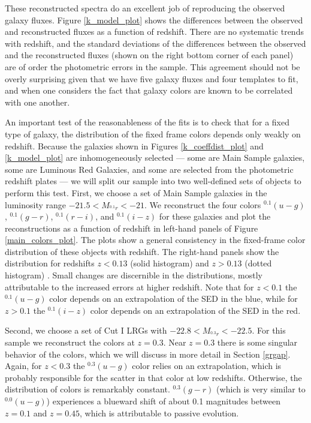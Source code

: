 \documentclass[10pt,preprint]{aastex}
\newcommand{\band}[2]{\ensuremath{^{#1}\!{#2}}}
\begin{document}
These reconstructed spectra do an excellent job of reproducing the
observed galaxy fluxes. Figure \ref{k_model_plot} shows the
differences between the observed and reconstructed fluxes as a
function of redshift. There are no systematic trends with redshift,
and the standard deviations of the differences between the observed
and the reconstructed fluxes (shown on the right bottom corner of each
panel) are of order the photometric errors in the sample. This
agreement should not be overly surprising given that we have five
galaxy fluxes and four templates to fit, and when one considers the
fact that galaxy colors are known to be correlated with one another.

An important test of the reasonableness of the fits is to check that
for a fixed type of galaxy, the distribution of the fixed frame colors
depends only weakly on redshift. Because the galaxies shown in Figures
\ref{k_coeffdist_plot} and \ref{k_model_plot} are inhomogeneously
selected --- some are Main Sample galaxies, some are Luminous Red
Galaxies, and some are selected from the photometric redshift plates
--- we will split our sample into two well-defined sets of objects to
perform this test. First, we choose a set of Main Sample galaxies in
the luminosity range $-21.5 < M_{\band{0.1}{r}} < -21$. We reconstruct
the four colors $^{0.1}(u-g)$, $^{0.1}(g-r)$, $^{0.1}(r-i)$, and
$^{0.1}(i-z)$ for these galaxies and plot the reconstructions as a
function of redshift in left-hand panels of Figure
\ref{main_colors_plot}. The plots show a general consistency in the
fixed-frame color distribution of these objects with redshift. The
right-hand panels show the distribution for redshifts $z<0.13$ (solid
histogram) and $z>0.13$ (dotted histogram) . Small changes are
discernible in the distributions, mostly attributable to the increased
errors at higher redshift. Note that for $z<0.1$ the $^{0.1}(u-g)$
color depends on an extrapolation of the SED in the blue, while for
$z>0.1$ the $^{0.1}(i-z)$ color depends on an extrapolation of the SED
in the red.

Second, we choose a set of Cut I LRGs with $-22.8 < M_{\band{0.3}{r}}
< -22.5$. For this sample we reconstruct the colors at $z=0.3$.  Near
$z=0.3$ there is some singular behavior of the colors, which we will
discuss in more detail in Section \ref{grgap}. Again, for $z<0.3$ the
$^{0.3}(u-g)$ color relies on an extrapolation, which is probably
responsible for the scatter in that color at low redshifts. Otherwise,
the distribution of colors is remarkably constant. $^{0.3}(g-r)$
(which is very similar to $^{0.0}(u-g)$) experiences a blueward shift
of about 0.1 magnitudes between $z=0.1$ and $z=0.45$, which is
attributable to passive evolution.
\end{document}
